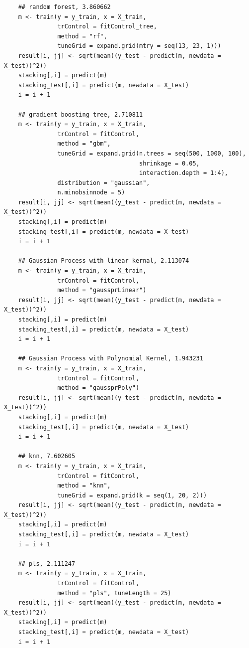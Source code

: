 \documentclass[11pt,oneside,a4paper]{article}
\begin{document}
\begin{verbatim}
    ## random forest, 3.860662
    m <- train(y = y_train, x = X_train,
               trControl = fitControl_tree,
               method = "rf", 
               tuneGrid = expand.grid(mtry = seq(13, 23, 1)))
    result[i, jj] <- sqrt(mean((y_test - predict(m, newdata = X_test))^2))
    stacking[,i] = predict(m)
    stacking_test[,i] = predict(m, newdata = X_test)
    i = i + 1
    
    ## gradient boosting tree, 2.710811
    m <- train(y = y_train, x = X_train,
               trControl = fitControl,
               method = "gbm", 
               tuneGrid = expand.grid(n.trees = seq(500, 1000, 100), 
                                      shrinkage = 0.05, 
                                      interaction.depth = 1:4), 
               distribution = "gaussian", 
               n.minobsinnode = 5)
    result[i, jj] <- sqrt(mean((y_test - predict(m, newdata = X_test))^2))
    stacking[,i] = predict(m)
    stacking_test[,i] = predict(m, newdata = X_test)
    i = i + 1
    
    ## Gaussian Process with linear kernal, 2.113074
    m <- train(y = y_train, x = X_train,
               trControl = fitControl,
               method = "gaussprLinear")
    result[i, jj] <- sqrt(mean((y_test - predict(m, newdata = X_test))^2))
    stacking[,i] = predict(m)
    stacking_test[,i] = predict(m, newdata = X_test)
    i = i + 1
    
    ## Gaussian Process with Polynomial Kernel, 1.943231
    m <- train(y = y_train, x = X_train,
               trControl = fitControl,
               method = "gaussprPoly")
    result[i, jj] <- sqrt(mean((y_test - predict(m, newdata = X_test))^2))
    stacking[,i] = predict(m)
    stacking_test[,i] = predict(m, newdata = X_test)
    i = i + 1
    
    ## knn, 7.602605
    m <- train(y = y_train, x = X_train,
               trControl = fitControl,
               method = "knn",
               tuneGrid = expand.grid(k = seq(1, 20, 2)))
    result[i, jj] <- sqrt(mean((y_test - predict(m, newdata = X_test))^2))
    stacking[,i] = predict(m)
    stacking_test[,i] = predict(m, newdata = X_test)
    i = i + 1
    
    ## pls, 2.111247
    m <- train(y = y_train, x = X_train,
               trControl = fitControl,
               method = "pls", tuneLength = 25)
    result[i, jj] <- sqrt(mean((y_test - predict(m, newdata = X_test))^2))
    stacking[,i] = predict(m)
    stacking_test[,i] = predict(m, newdata = X_test)
    i = i + 1
    

\end{verbatim}
\end{document}
